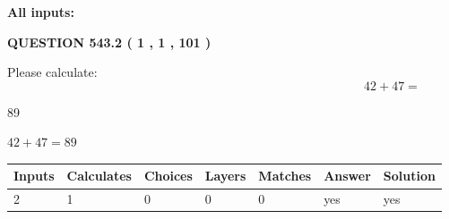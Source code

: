\documentclass[12pt]{article}
\begin{document}
   
\noindent{}
   
   
   
   
\noindent\vspace{0.1in}\hspace{-0.08in} {\textbf{\Large{All inputs: }}}
   
   
  
\vspace{0.2in}
  
{\textbf{\Large{QUESTION
543.2 
 ( 1 , 1 , 101 )
}}}
  
  
 
Please calculate:
\begin{equation}
42 +  %
47 = \nonumber
\end{equation}
 
 
 
\noindent{}
 
 

89
 
 
\noindent{}
 
 

 
 
 
\noindent{}
 
 

$ %
42 +  %
47=   %
89$
 
 
\noindent{}
 
 

 
   
   
   
   
\noindent\begin{tabular}{|l|l|l|l|l|l|l|}
 \hline
Inputs & Calculates & Choices & Layers & Matches & Answer & Solution \\ \hline
 2  & 
 1  & 
 0
  & 
 0  & 
 0  & 
  yes & 
  yes 
  \\ \hline
 \end{tabular}
   
   
   
   
\noindent{}
   
   
  
\end{document}
